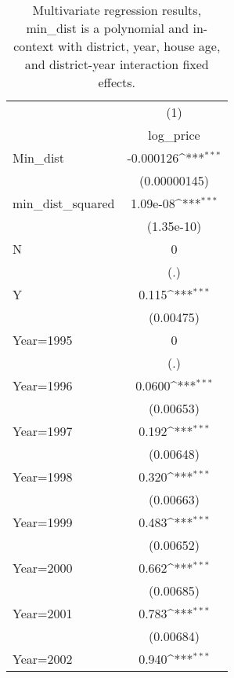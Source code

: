 {
\def\sym#1{\ifmmode^{#1}\else\(^{#1}\)\fi}
\begin{longtable}{l*{1}{c}}
\caption{Multivariate regression results, min\_dist is a polynomial and in-context with district, year, house age, and district-year interaction fixed effects.}\\
\toprule\endfirsthead\midrule\endhead\midrule\endfoot\endlastfoot
                    &\multicolumn{1}{c}{(1)}\\
                    &\multicolumn{1}{c}{log\_price}\\
\midrule
Min\_dist            &   -0.000126\sym{***}\\
                    &(0.00000145)         \\
\addlinespace
min\_dist\_squared    &    1.09e-08\sym{***}\\
                    &  (1.35e-10)         \\
\addlinespace
N                   &           0         \\
                    &         (.)         \\
\addlinespace
Y                   &       0.115\sym{***}\\
                    &   (0.00475)         \\
\addlinespace
Year=1995           &           0         \\
                    &         (.)         \\
\addlinespace
Year=1996           &      0.0600\sym{***}\\
                    &   (0.00653)         \\
\addlinespace
Year=1997           &       0.192\sym{***}\\
                    &   (0.00648)         \\
\addlinespace
Year=1998           &       0.320\sym{***}\\
                    &   (0.00663)         \\
\addlinespace
Year=1999           &       0.483\sym{***}\\
                    &   (0.00652)         \\
\addlinespace
Year=2000           &       0.662\sym{***}\\
                    &   (0.00685)         \\
\addlinespace
Year=2001           &       0.783\sym{***}\\
                    &   (0.00684)         \\
\addlinespace
Year=2002           &       0.940\sym{***}\\

\end{longtable}}
